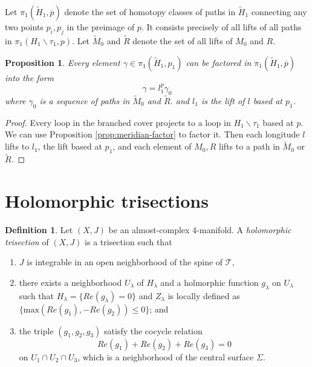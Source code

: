 \documentclass[11pt]{amsart}
\newtheorem{proposition}[theorem]{Proposition}
\theoremstyle{definition}
\newtheorem{definition}[theorem]{Definition}
\theoremstyle{remark}
\numberwithin{equation}{section}
\newcommand{\Ht}{\widetilde{H}}
\newcommand{\Mt}{\widetilde{M}}
\newcommand{\Rt}{\widetilde{R}}
\newcommand{\cT}{\mathcal{T}}
\begin{document}
Let $\pi_1(\Ht_1,\overline{p})$ denote the set of homotopy classes of paths in $\Ht_1$ connecting any two points $p_i,p_j$ in the preimage of $p$.  It consists precisely of all lifts of all paths in $\pi_1(H_1 \smallsetminus \tau_1,p)$.  Let $\Mt_0$ and $\Rt$ denote the set of all lifts of $M_0$ and $R$.

\begin{proposition}
\label{prop:upstairs-factor}
Every element $\gamma \in \pi_1(\Ht_1,p_1)$ can be factored in $\pi_1(\Ht_1,\overline{p})$ into the form
\[\gamma = l_1^p \gamma_0\]
where $\gamma_0$ is a sequence of paths in $\Mt_0$ and $\Rt$. and $l_1$ is the lift of $l$ based at $p_1$.
\end{proposition}

\begin{proof}
Every loop in the branched cover projects to a loop in $H_1 \smallsetminus \tau_1$ based at $p$. We can use Proposition \ref{prop:meridian-factor} to factor it. Then each longitude $l$ lifts to $l_1$, the lift based at $p_1$, and each element of $M_0,R$ lifts to a path in $\Mt_0$ or $\Rt$.
\end{proof}



\section{Holomorphic trisections}



\begin{definition}
    Let $(X,J)$ be an almost-complex 4-manifold.  A {\it holomorphic trisection} of $(X,J)$ is a trisection such that
    \begin{enumerate}
        \item $J$ is integrable in an open neighborhood of the spine of $\cT$,
        \item there exists a neighborhood $U_{\lambda}$ of $H_{\lambda}$ and a holmorphic function $g_{\lambda}$ on $U_{\lambda}$ such that $H_{\lambda} = \{Re(g_{\lambda}) = 0\}$ and $Z_{\lambda}$ is locally defined as $\{\text{max}(Re(g_1),-Re(g_2)) \leq 0\}$; and
        \item the triple $(g_1,g_2,g_3)$ satisfy the cocycle relation
        \[Re(g_1) + Re(g_2) + Re(g_3) = 0\]
        on $U_1 \cap U_2 \cap U_3$, which is a neighborhood of the central surface $\Sigma$.
    \end{enumerate}
\end{definition}
\end{document}
